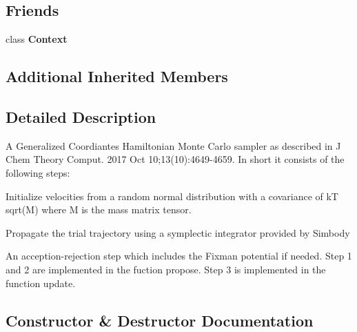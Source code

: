 \subsection*{Friends}
\begin{DoxyCompactItemize}
\item 
class {\bfseries Context}\hypertarget{classLAHMCSampler_ac26c806e60ca4a0547680edb68f6e39b}{}\label{classLAHMCSampler_ac26c806e60ca4a0547680edb68f6e39b}

\end{DoxyCompactItemize}
\subsection*{Additional Inherited Members}


\subsection{Detailed Description}
A Generalized Coordiantes Hamiltonian Monte Carlo sampler as described in J Chem Theory Comput. 2017 Oct 10;13(10)\+:4649-\/4659. In short it consists of the following steps\+:
\begin{DoxyEnumerate}
\item Initialize velocities from a random normal distribution with a covariance of kT sqrt(\+M) where M is the mass matrix tensor.
\item Propagate the trial trajectory using a symplectic integrator provided by Simbody
\item An acception-\/rejection step which includes the Fixman potential if needed. Step 1 and 2 are implemented in the fuction propose. Step 3 is implemented in the function update. 
\end{DoxyEnumerate}

\subsection{Constructor \& Destructor Documentation}
